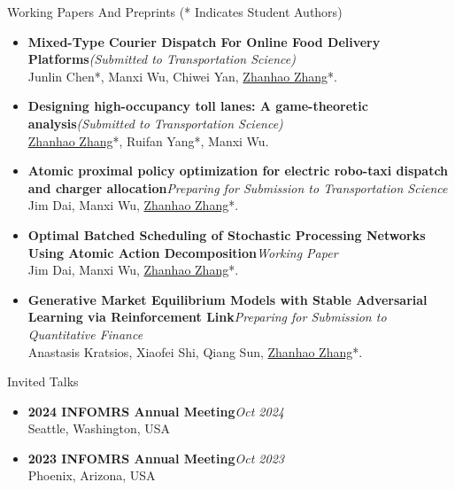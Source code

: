 \documentclass{resume} %
\begin{document}
\begin{rSection}{Working Papers And Preprints ({* Indicates Student Authors})}
\begin{itemize}
\item {\bf Mixed-Type Courier Dispatch For Online Food Delivery Platforms}\hfill {\em (Submitted to Transportation Science)}\\
Junlin Chen*, Manxi Wu, Chiwei Yan, \underline{Zhanhao Zhang}*.
\item {\bf Designing high-occupancy toll lanes: A game-theoretic analysis}\hfill {\em (Submitted to Transportation Science)}\\
\underline{Zhanhao Zhang}*, Ruifan Yang*, Manxi Wu.
\item {\bf Atomic proximal policy optimization for electric robo-taxi dispatch and charger allocation}\hfill {\em Preparing for Submission to Transportation Science}\\
Jim Dai, Manxi Wu, \underline{Zhanhao Zhang}*.
\item {\bf Optimal Batched Scheduling of Stochastic Processing Networks Using Atomic Action Decomposition}\hfill {\em Working Paper}\\
Jim Dai, Manxi Wu, \underline{Zhanhao Zhang}*.
\item {\bf Generative Market Equilibrium Models with Stable Adversarial Learning via Reinforcement Link}\hfill {\em Preparing for Submission to Quantitative Finance}\\
Anastasis Kratsios, Xiaofei Shi, Qiang Sun, \underline{Zhanhao Zhang}*.
\end{itemize}
\end{rSection}


\begin{rSection}{Invited Talks}
\begin{itemize}
\item {\bf 2024 INFOMRS Annual Meeting}\hfill {\em Oct 2024}\\
Seattle, Washington, USA
\item {\bf 2023 INFOMRS Annual Meeting}\hfill {\em Oct 2023}\\
Phoenix, Arizona, USA
\end{itemize}
\end{rSection}
\end{document}
